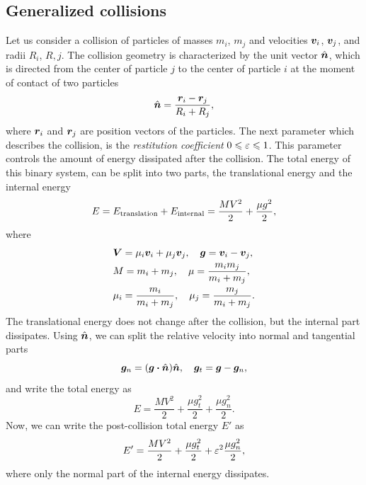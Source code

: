 \documentclass[aps,prl,preprint,groupedaddress,10pt]{revtex4-2}
\begin{document}
\subsection{Generalized collisions}
Let us consider a collision of particles of masses $m_i$, $m_j$ and
velocities $\vb*{v}_i$, $\vb*{v}_j$, and radii $R_i$, $R,j$. The collision geometry is
characterized by the unit vector $\hat{\vb*{n}}$, which is directed from the center of particle
$j$ to the center of particle $i$ at the moment of contact of two particles
\begin{equation}
    \hat{\vb*{n}}=\frac{\vb*{r}_i-\vb*{r}_j}{R_i+R_j},
\end{equation}
where $\vb*{r}_i$ and $\vb*{r}_j$ are position vectors of the particles. The next parameter
which describes the collision, is the \emph{restitution coefficient}
$0\leqslant\varepsilon\leqslant 1$. This parameter controls the amount of energy dissipated
after the collision. The total energy of this binary system, can be split into two parts,
the translational energy and the internal energy
\begin{equation}
    E=E_{\mathrm{translation}}+E_{\mathrm{internal}}=\frac{MV^2}{2}+\frac{\mu g^2}{2},
\end{equation}
where
\begin{equation}
    \begin{split}
        &\vb*{V}=\mu_i\vb*{v}_i+\mu_j\vb*{v}_j,\quad\vb*{g}=\vb*{v}_i-\vb*{v}_j,\\
        &M=m_i+m_j,\quad\mu=\frac{m_im_j}{m_i+m_j},\\
        &\mu_i=\frac{m_i}{m_i+m_j},\quad\mu_j=\frac{m_j}{m_i+m_j}.
    \end{split}
\end{equation}
The translational energy does not change after the collision, but the internal part
dissipates. Using $\hat{\vb*{n}}$, we can split the relative velocity into normal and tangential
parts
\begin{equation}
    \bg_n=\pqty{\bg\vdot\bn}\bn,\quad\bg_t=\bg-\bg_n,
\end{equation}
and write the total energy as
\begin{equation}
    E=\frac{MV^2}{2}+\frac{\mu g_t^2}{2}+\frac{\mu g_n^2}{2}.
\end{equation}
Now, we can write the post-collision total energy $E'$ as
\begin{equation}
    E'=\frac{MV^2}{2}+\frac{\mu g_t^2}{2}+\varepsilon^2\frac{\mu g_n^2}{2},
\end{equation}
where only the normal part of the internal energy dissipates.
\end{document}
